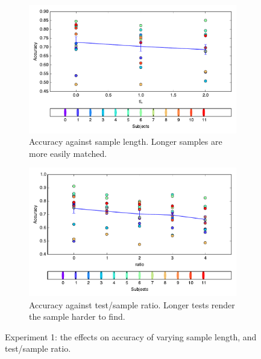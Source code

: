 \begin{figure}[htp]
\centering
\begin{subfigure}[b]{\textwidth}
\centering
                \includegraphics[width=12cm]{img/fig_fire3_correct_tL.pdf}
                \caption{Accuracy against sample length. Longer samples are more easily matched.}
          
        \end{subfigure}
\begin{subfigure}[b]{\textwidth}
\centering
                \includegraphics[width=12cm]{img/fig_fire3_correct_ratio.pdf}
                \caption{Accuracy against test/sample ratio. Longer tests render the sample harder to find.}
         
        \end{subfigure}
\caption{Experiment 1: the effects on accuracy of varying sample length, and test/sample ratio.}
\end{figure}

